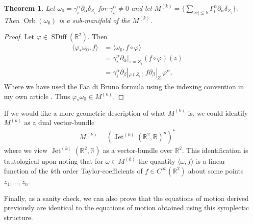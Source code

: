 \documentclass[12pt]{amsart}
\newcommand{\R}{\ensuremath{\mathbb{R}}}
\newtheorem{thm}{Theorem}[section]
\DeclareMathOperator{\SDiff}{SDiff}
\DeclareMathOperator{\Jet}{Jet}
\DeclareMathOperator{\Orb}{Orb}
\begin{document}
\begin{thm}
	Let $\omega_0 = \gamma_i^\alpha \partial_{\alpha} \delta_{Z_i}$ for $\gamma_i^\alpha \neq 0$ and let
	$M^{(k)} = \{ \sum_{|\alpha| \leq k} \Gamma_i^\alpha \partial_{\alpha} \delta_{Z_i} \}$.
	Then $\Orb(\omega_0)$ is a sub-manifold of the $M^{(k)}$.
\end{thm}
\begin{proof}
	Let $\varphi \in \SDiff(\R^2)$.  Then
	\begin{align*}
		\langle \varphi_* \omega_0 , f \rangle &= \langle \omega_0 , f \circ \varphi \rangle \\
                &= \gamma_i^\alpha \partial_{\alpha}|_{z=Z_i} (f \circ\varphi)(z) \\
                &= \gamma_i^\alpha \partial_{\beta}|_{\varphi(Z_i)} f \partial_\beta|_{Z_i} \varphi^\alpha.
	\end{align*}
        Where we have used the Faa di Bruno formula using the indexing convention in my own article \cite{Jacobs2014b}.
        Thus $\varphi_* \omega_0 \in M^{(k)}$.
\end{proof}

If we would like a more geometric description of what $M^{(k)}$ is,
we could identify $M^{(k)}$ as a dual vector-bundle
\begin{align*}
  M^{(k)} = \left(\Jet^{(k)}( \R^2 , \R)^n \right)^*
\end{align*}
where we view $\Jet^{(k)}( \R^2 , \R)$ as a vector-bundle over $\R^2$.
This identification is tautological upon noting that for $\omega \in M^{(k)}$
the quantity $ \langle \omega , f \rangle$
is a linear function of the $k$th order Taylor-coefficients of $f \in C^\infty(\R^2)$
about some points $z_1,\dots,z_n$.

Finally, as a sanity check, we can also prove that the equations of motion derived previously are identical to
the equations of motion obtained using this symplectic structure.
\end{document}
